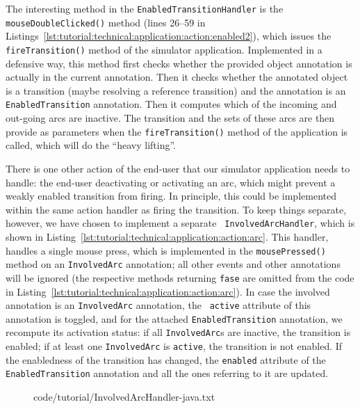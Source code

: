 The interesting method in the {\tt EnabledTransitionHandler} is the {\tt
mouse\optsep{}Double\optsep{}Clicked()} method (lines 26--59 in
Listings~\ref{lst:tutorial:technical:application:action:enabled2}), which
issues the {\tt fireTransition()} method of the simulator application.
Implemented in a defensive way, this method first checks whether the provided object
annotation is actually in the current annotation. Then it checks whether the annotated object is a transition (maybe resolving a reference transition) and the annotation is an {\tt
EnabledTransition} annotation. Then it computes which of the incoming and
out-going arcs are inactive. The transition and the sets of these arcs are
then provide as parameters when the {\tt fireTransition()} method of the
application is called, which will do the ``heavy lifting''.

There is one other action of the end-user that our simulator application needs
to handle: the end-user deactivating or activating an arc, which might prevent 
a weakly enabled transition from firing. In principle, this could be implemented
within the same action handler as firing the transition. To keep things
separate, however, we have chosen to implement a separate {\tt
InvolvedArcHandler}, which is shown
in Listing~\ref{lst:tutorial:technical:application:action:arc}. This handler,
handles a single mouse press, which is implemented in the {\tt mousePressed()}
method on an {\tt InvolvedArc} annotation; all other events and other annotations will
be ignored (the respective methods returning {\tt fase} are omitted from the
code in Listing~\ref{lst:tutorial:technical:application:action:arc}).
In case the involved annotation is an {\tt InvolvedArc} annotation, the {\tt
active} attribute of this annotation is toggled, and for the attached
{\tt EnabledTransition} annotation, we recompute its activation status: if
all  {\tt InvolvedArc}s are inactive, the transition is enabled; if at least
one {\tt InvolvedArc} is {\tt active}, the transition is not enabled. If the
enabledness of the transition has changed, the {\tt enabled} attribute of
the {\tt EnabledTransition} annotation and all the ones referring to it are
updated.

\begin{figure}[htbp!]
%
  {code/tutorial/InvolvedArcHandler-java.txt}
\end{figure}


